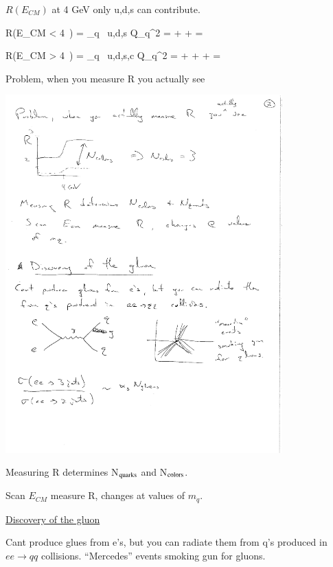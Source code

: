 {$R(E_{CM})$ at 4 GeV only u,d,s can contribute.

\be
R(E_{CM} < 4\ ) = \sum_{q \in\ u,d,s} Q_q^2 =  +  +  = 
\ee


\be
R(E_{CM} > 4\ ) = \sum_{q \in\ u,d,s,c} Q_q^2 =  +  +  +  = 
\ee

\clearpage

Problem, when you measure R you actually see

\bc
\includegraphics[width=0.8\textwidth]{./ObservedR.pdf}
\ec

Measuring R determines N$_{\textrm{quarks}}$ and N$_{\textrm{colors}}$.

Scan $E_{CM}$ measure R, changes at values of $m_q$.


\underline{Discovery of the gluon}

Cant produce glues from e's, but you can radiate them from q's produced in $ee\rightarrow qq$ collisions.
``Mercedes'' events smoking gun for gluons.

}
